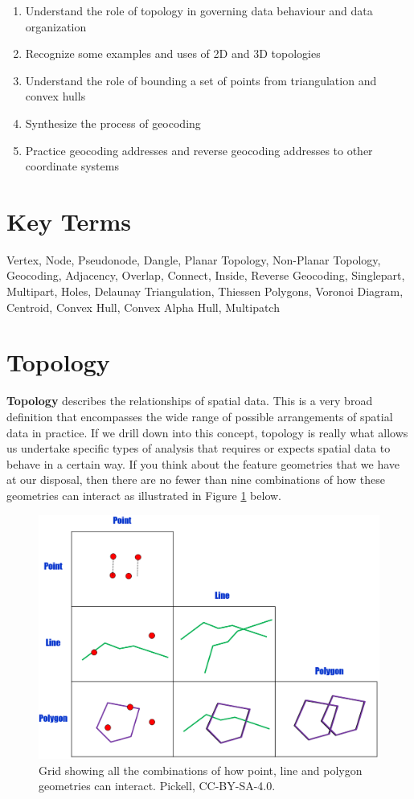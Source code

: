 \documentclass[
]{book}
\providecommand{\tightlist}{%
  \setlength{\itemsep}{0pt}\setlength{\parskip}{0pt}}
\begin{document}
\begin{enumerate}
\def\labelenumi{\arabic{enumi}.}
\tightlist
\item
  Understand the role of topology in governing data behaviour and data organization
\item
  Recognize some examples and uses of 2D and 3D topologies
\item
  Understand the role of bounding a set of points from triangulation and convex hulls
\item
  Synthesize the process of geocoding
\item
  Practice geocoding addresses and reverse geocoding addresses to other coordinate systems
\end{enumerate}

\hypertarget{key-terms-6}{%
\section*{Key Terms}\label{key-terms-6}}

Vertex, Node, Pseudonode, Dangle, Planar Topology, Non-Planar Topology, Geocoding, Adjacency, Overlap, Connect, Inside, Reverse Geocoding, Singlepart, Multipart, Holes, Delaunay Triangulation, Thiessen Polygons, Voronoi Diagram, Centroid, Convex Hull, Convex Alpha Hull, Multipatch

\hypertarget{topology}{%
\section{Topology}\label{topology}}

\textbf{Topology} describes the relationships of spatial data. This is a very broad definition that encompasses the wide range of possible arrangements of spatial data in practice. If we drill down into this concept, topology is really what allows us undertake specific types of analysis that requires or expects spatial data to behave in a certain way. If you think about the feature geometries that we have at our disposal, then there are no fewer than nine combinations of how these geometries can interact as illustrated in Figure \ref{fig:7-topology-grid} below.

\begin{figure}
\includegraphics[width=0.75\linewidth]{images/07-topology-grid} \caption{Grid showing all the combinations of how point, line and polygon geometries can interact. Pickell, CC-BY-SA-4.0.}\label{fig:7-topology-grid}
\end{figure}
\end{document}
